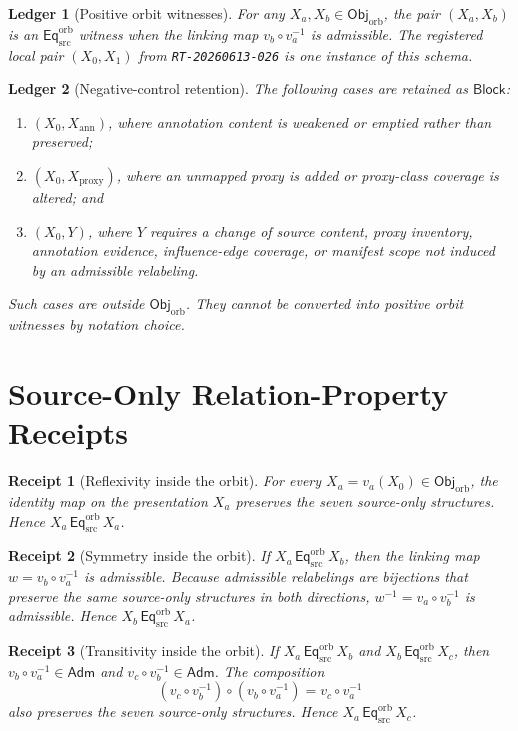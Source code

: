 \documentclass[11pt]{article}
\newcommand{\ObjOrb}{\mathsf{Obj}_{\mathrm{orb}}}
\newcommand{\Adm}{\mathsf{Adm}}
\newcommand{\EqOrb}{\mathsf{Eq}_{\mathrm{src}}^{\mathrm{orb}}}
\newcommand{\Block}{\mathsf{Block}}
\newtheorem{receipt}{Receipt}
\newtheorem{ledger}{Ledger}
\begin{document}
\begin{ledger}[Positive orbit witnesses]
For any \(X_{a},X_{b}\in\ObjOrb\), the pair
\((X_{a},X_{b})\) is an \(\EqOrb\) witness when the linking map
\(v_{b}\circ v_{a}^{-1}\) is admissible. The registered local pair
\((X_{0},X_{1})\) from \texttt{RT-20260613-026} is one instance of this
schema.
\end{ledger}

\begin{ledger}[Negative-control retention]
The following cases are retained as \(\Block\):
\begin{enumerate}
    \item \((X_{0},X_{\mathrm{ann}})\), where annotation content is weakened
    or emptied rather than preserved;
    \item \((X_{0},X_{\mathrm{proxy}})\), where an unmapped proxy is added or
    proxy-class coverage is altered; and
    \item \((X_{0},Y)\), where \(Y\) requires a change of source content,
    proxy inventory, annotation evidence, influence-edge coverage, or
    manifest scope not induced by an admissible relabeling.
\end{enumerate}
Such cases are outside \(\ObjOrb\). They cannot be converted into positive
orbit witnesses by notation choice.
\end{ledger}

\section{Source-Only Relation-Property Receipts}

\begin{receipt}[Reflexivity inside the orbit]
For every \(X_{a}=v_{a}(X_{0})\in\ObjOrb\), the identity map on the
presentation \(X_{a}\) preserves the seven source-only structures. Hence
\(X_{a}\,\EqOrb\,X_{a}\).
\end{receipt}

\begin{receipt}[Symmetry inside the orbit]
If \(X_{a}\,\EqOrb\,X_{b}\), then the linking map
\(w=v_{b}\circ v_{a}^{-1}\) is admissible. Because admissible relabelings
are bijections that preserve the same source-only structures in both
directions, \(w^{-1}=v_{a}\circ v_{b}^{-1}\) is admissible. Hence
\(X_{b}\,\EqOrb\,X_{a}\).
\end{receipt}

\begin{receipt}[Transitivity inside the orbit]
If \(X_{a}\,\EqOrb\,X_{b}\) and \(X_{b}\,\EqOrb\,X_{c}\), then
\(v_{b}\circ v_{a}^{-1}\in\Adm\) and
\(v_{c}\circ v_{b}^{-1}\in\Adm\). The composition
\[
    (v_{c}\circ v_{b}^{-1})\circ(v_{b}\circ v_{a}^{-1})
    = v_{c}\circ v_{a}^{-1}
\]
also preserves the seven source-only structures. Hence
\(X_{a}\,\EqOrb\,X_{c}\).
\end{receipt}
\end{document}
